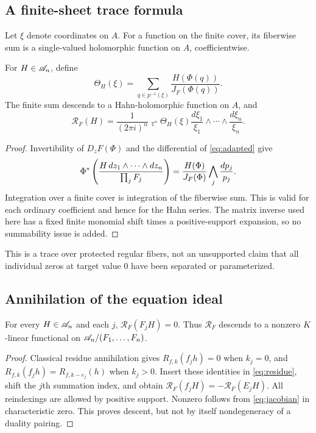 \documentclass[11pt,letterpaper]{article}
\theoremstyle{definition}
\theoremstyle{remark}
\newcommand{\HInt}{\mathop{\int^{\!H}}\nolimits}
\newcommand{\T}{\mathbb T}\newcommand{\D}{\mathbb D}
\numberwithin{equation}{section}
\begin{document}
\subsection{A finite-sheet trace formula}
Let $\xi$ denote coordinates on $A$. For a function on the finite cover, its
fiberwise sum is a single-valued holomorphic function on $A$, coefficientwise.

\begin{corollary}\label{cor:trace}
For $H\in\mathscr A_n$, define
\[
 \Theta_H(\xi)=\sum_{q\in p^{-1}(\xi)}
 \frac{H(\Phi(q))}{J_F(\Phi(q))}.
\]
The finite sum descends to a Hahn-holomorphic function on $A$, and
\begin{equation}\label{eq:trace}
 \mathcal R_F(H)=\frac1{(2\pi i)^n}
 \HInt_{\T^n}\Theta_H(\xi)
 \frac{d\xi_1}{\xi_1}\wedge\cdots\wedge\frac{d\xi_n}{\xi_n}.
\end{equation}
\end{corollary}
\begin{proof}
Invertibility of $D_zF(\Phi)$ and the differential of \eqref{eq:adapted}
give
\[
 \Phi^*\left(\frac{H\,dz_1\wedge\cdots\wedge dz_n}{\prod_jF_j}\right)
 =\frac{H(\Phi)}{J_F(\Phi)}\bigwedge_j\frac{dp_j}{p_j}.
\]
Integration over a finite cover is integration of the fiberwise sum. This is
valid for each ordinary coefficient and hence for the Hahn series. The
matrix inverse used here has a fixed finite monomial shift times a
positive-support expansion, so no summability issue is added.
\end{proof}

This is a trace over protected regular fibers, not an unsupported claim that
all individual zeros at target value $0$ have been separated or parameterized.

\subsection{Annihilation of the equation ideal}
\begin{proposition}\label{prop:annihilate}
For every $H\in\mathscr A_n$ and each $j$,
$\mathcal R_F(F_jH)=0$. Thus $\mathcal R_F$ descends to a nonzero
$K$-linear functional on $\mathscr A_n/(F_1,\ldots,F_n)$.
\end{proposition}
\begin{proof}
Classical residue annihilation gives $R_{f,k}(f_jh)=0$ when $k_j=0$, and
$R_{f,k}(f_jh)=R_{f,k-e_j}(h)$ when $k_j>0$. Insert these identities in
\eqref{eq:residue}, shift the $j$th summation index, and obtain
$\mathcal R_F(f_jH)=-\mathcal R_F(E_jH)$. All reindexings are allowed by
positive support. Nonzero follows from \eqref{eq:jacobian} in characteristic
zero. This proves descent, but not by itself nondegeneracy of a duality pairing.
\end{proof}
\end{document}
